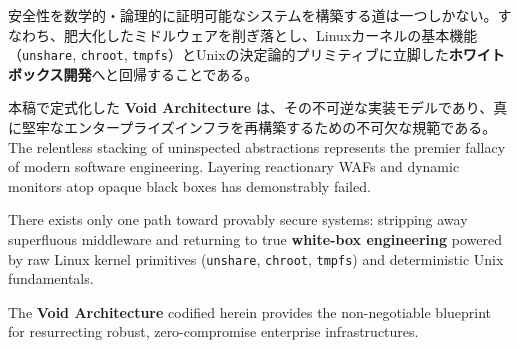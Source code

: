\documentclass[10pt,a4paper,twocolumn]{article}
\begin{document}
安全性を数学的・論理的に証明可能なシステムを構築する道は一つしかない。すなわち、肥大化したミドルウェアを削ぎ落とし、Linuxカーネルの基本機能（\texttt{unshare}, \texttt{chroot}, \texttt{tmpfs}）とUnixの決定論的プリミティブに立脚した\textbf{ホワイトボックス開発}へと回帰することである。

本稿で定式化した \textbf{Void Architecture\texttrademark} は、その不可逆な実装モデルであり、真に堅牢なエンタープライズインフラを再構築するための不可欠な規範である。
\else
The relentless stacking of uninspected abstractions represents the premier fallacy of modern software engineering. Layering reactionary WAFs and dynamic monitors atop opaque black boxes has demonstrably failed.

There exists only one path toward provably secure systems: stripping away superfluous middleware and returning to true \textbf{white-box engineering} powered by raw Linux kernel primitives (\texttt{unshare}, \texttt{chroot}, \texttt{tmpfs}) and deterministic Unix fundamentals.

The \textbf{Void Architecture\texttrademark} codified herein provides the non-negotiable blueprint for resurrecting robust, zero-compromise enterprise infrastructures.
\fi
\end{document}
